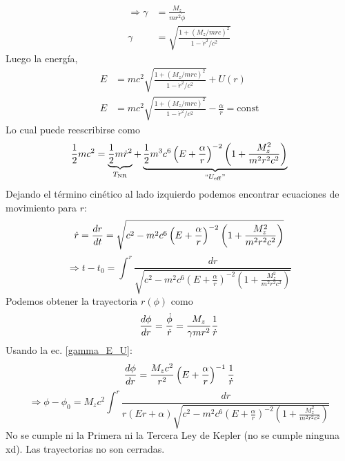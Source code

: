 \documentclass[]{article}
\numberwithin{equation}{section}
\begin{document}
\begin{align}
	\Rightarrow \gamma &= \frac{M_{z}}{m r^2 \dot{\phi}} \nonumber\\
	\gamma &= \sqrt{\frac{1 + (M_{z}/m r c)^2}{1 - \dot{r}^2/c^2}}
\end{align}
Luego la energía,
\begin{align}
	E &= m c^2 \sqrt{\frac{1 + (M_{z}/m r c)^2}{1 - \dot{r}^2/c^2}} + U(r)\\
	E &= m c^2 \sqrt{\frac{1 + (M_{z}/m r c)^2}{1 - \dot{r}^2/c^2}} - \frac{\alpha}{r} = \mathrm{const}
\end{align}
Lo cual puede reescribirse como
\begin{equation}
	\frac{1}{2} m c^2 = \underbrace{\frac{1}{2} m \dot{r}^2}_{T_{\mathrm{NR}}} + \underbrace{\frac{1}{2} m^3 c^6 \left(E + \frac{\alpha}{r}\right)^{-2} \left(1 + \frac{M_{z}^2}{m^2 r^2 c^2}\right)}_{``U_\mathrm{eff}"}
\end{equation}
Dejando el término cinético al lado izquierdo podemos encontrar ecuaciones de movimiento para \(r\):
\begin{equation}
	\dot{r} = \dfrac{d r}{d t} = \sqrt{c^2 - m^2 c^6 \left(E + \frac{\alpha}{r}\right)^{-2} \left(1 + \frac{M_{z}^2}{m^2 r^2 c^2}\right)}
\end{equation}
\begin{equation}
	\Rightarrow t - t_0 = \int^{r} \frac{dr}{\sqrt{c^2 - m^2 c^6 \left(E + \frac{\alpha}{r}\right)^{-2} \left(1 + \frac{M_{z}^2}{m^2 r^2 c^2}\right)}}
\end{equation}
Podemos obtener la trayectoria \(r(\phi)\) como
\begin{equation*}
	\dfrac{d \phi}{d r} = \frac{\dot{\phi}}{\dot{r}} = \frac{M_z}{\gamma m r^2}\frac{1}{\dot{r}}
\end{equation*}
Usando la ec. \ref{gamma_E_U}:
\begin{equation*}
	\dfrac{d \phi}{d r} = \frac{M_z c^2}{r^2}\left(E  + \frac{\alpha}{r}\right)^{-1} \frac{1}{\dot{r}}
\end{equation*}
\begin{equation}
	\Rightarrow \phi - \phi_0 = M_z c^2 \int^{r} \frac{dr}{r \left(E r + \alpha \right) \sqrt{c^2 - m^2 c^6 \left(E + \frac{\alpha}{r}\right)^{-2} \left(1 + \frac{M_{z}^2}{m^2 r^2 c^2}\right)}}
\end{equation}
No se cumple ni la Primera ni la Tercera Ley de Kepler (no se cumple ninguna xd). Las trayectorias no son cerradas.
\end{document}
